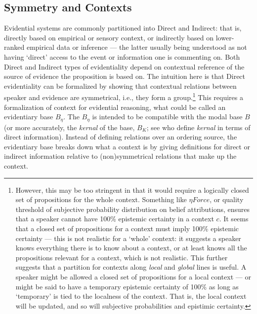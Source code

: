 \documentclass[11pt]{article}
\begin{document}
\subsection{Symmetry and Contexts}
Evidential systems are commonly partitioned into Direct and Indirect: that is,
directly based on  empirical or sensory context, or indirectly based on
lower-ranked empirical data or inference --- the latter usually being understood
as not having `direct' access to the event or  information one is commenting on.
Both Direct and Indirect types of evidentiality depend on contextual reference
of the source of evidence the proposition is based on. The intuition here is
that Direct evidentiality can be formalized by showing that contextual relations
between speaker and evidence are symmetrical, i.e., they form a
group.\footnote{However, this may be too stringent in that it would require a
logically closed set of propositions for the whole context. Something like $\eta Force$, or quality threshold of subjective probability distribution on belief attributions, ensures that a speaker cannot have 100\% epistemic certainty in a context $c$. It seems that a closed set of propositions for a context must imply 100\% epistemic certainty --- this is not realistic for a `whole' context: it suggests a speaker knows everything there is to know about a context, or at least knows all the propositions relevant for a context, which is not realistic. This further suggests that a partition for contexts along \textsl{local} and \textsl{global} lines is useful. A speaker might be allowed a closed set of propositions for a local context --- or might be said to have a temporary epistemic certainty of 100\% as long as `temporary' is tied to the localness of the context. That is, the local context will be updated, and so will subjective probabilities and epistimic certainty.} This requires a
formalization of context for evidential reasoning, what could be called an
evidentiary base $B_{\eta}$. The $B_{\eta}$ is intended to be compatible with
the modal base $B$ (or more accurately, the \textsl{kernal} of the base,
$B_{K}$; see \cite{vonfintelgillies09must} who define \textsl{kernal} in terms
of direct information). Instead of defining relations over an ordering source, the evidentiary base
breaks down what a context is by giving definitions for direct or indirect
information relative to (non)symmetrical relations that make up the context.  
\end{document}
